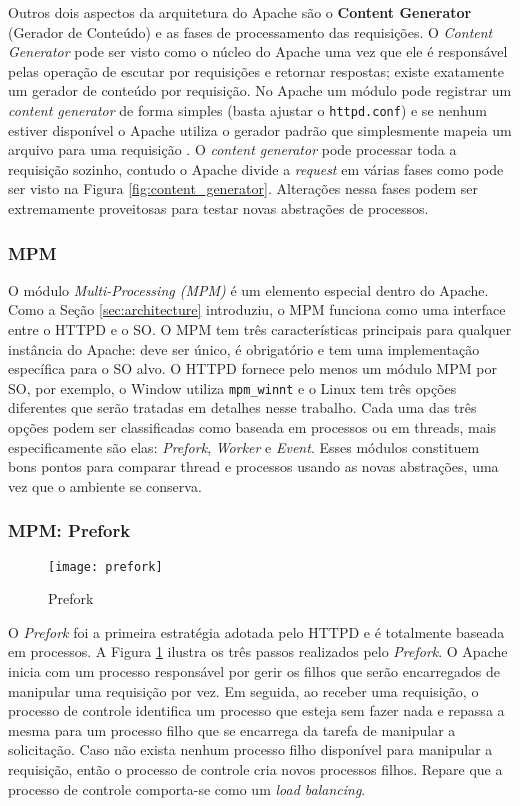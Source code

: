 Outros dois aspectos da arquitetura do Apache são o \textbf{Content Generator}
(Gerador de Conteúdo) e as fases de processamento das requisições. O
\textit{Content Generator} pode ser visto como o núcleo do Apache uma vez que
ele é responsável pelas operação de escutar por requisições e retornar
respostas; existe exatamente um gerador de conteúdo por requisição. No Apache
um módulo pode registrar um \textit{content generator} de forma simples (basta
ajustar o \texttt{httpd.conf}) e se nenhum estiver disponível o Apache utiliza
o gerador padrão que simplesmente mapeia um arquivo para uma requisição
\citep{apache_module_book}. O \textit{content generator} pode processar toda a
requisição sozinho, contudo o Apache divide a \textit{request} em várias fases
como pode ser visto na Figura \ref{fig:content_generator}. Alterações nessa
fases podem ser extremamente proveitosas para testar novas abstrações de
processos.

\subsubsection{MPM}

O módulo \textit{Multi-Processing (MPM)} é um elemento especial dentro do
Apache. Como a Seção \ref{sec:architecture} introduziu, o MPM funciona como uma
interface entre o HTTPD e o SO. O MPM tem três características principais para
qualquer instância do Apache: deve ser único, é obrigatório e tem uma
implementação específica para o SO alvo. O HTTPD fornece pelo menos um módulo
MPM por SO, por exemplo, o Window utiliza \texttt{mpm\_winnt} e o Linux tem
três opções diferentes que serão tratadas em detalhes nesse trabalho. Cada uma
das três opções podem ser classificadas como baseada em processos ou em
threads, mais especificamente são elas: \textit{Prefork}, \textit{Worker} e
\textit{Event}. Esses módulos constituem bons pontos para comparar thread e
processos usando as novas abstrações, uma vez que o ambiente se conserva.

\subsubsection{MPM: Prefork}
\label{sec:prefork}

\begin{figure}[!h]
  \centering
  \texttt{[image: prefork]} 
  \caption{Prefork}
  \label{fig:prefork} 
\end{figure}

O \textit{Prefork} foi a primeira estratégia adotada pelo HTTPD e é totalmente
baseada em processos. A Figura \ref{fig:prefork} ilustra os três passos
realizados pelo \textit{Prefork}. O Apache inicia com um processo responsável
por gerir os filhos que serão encarregados de manipular uma requisição por vez.
Em seguida, ao receber uma requisição, o processo de controle identifica um
processo que esteja sem fazer nada e repassa a mesma para um processo filho que
se encarrega da tarefa de manipular a solicitação. Caso não exista nenhum
processo filho disponível para manipular a requisição, então o processo de
controle cria novos processos filhos. Repare que a processo de controle
comporta-se como um \textit{load balancing}.

